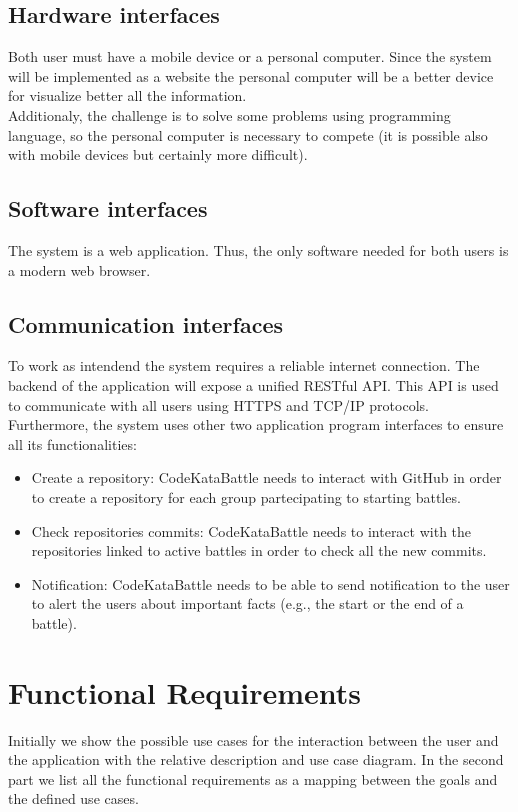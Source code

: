 \documentclass[12pt, a4paper]{report}
\begin{document}
        \subsection{Hardware interfaces}
        Both user must have a mobile device or a personal computer. 
        Since the system will be implemented as a website the personal computer will be a better device for visualize better all the information. \\
        Additionaly, the challenge is to solve some problems using programming language, so the personal computer is necessary to compete (it is possible also with mobile devices but certainly more difficult). 

        \subsection{Software interfaces}
        The system is a web application. 
        Thus, the only software needed for both users is a modern web browser. 

        \subsection{Communication interfaces}
        To work as intendend the system requires a reliable internet connection. 
        The backend of the application will expose a unified RESTful API. 
        This API is used to communicate with all users using HTTPS and TCP/IP protocols. \\
        Furthermore, the system uses other two application program interfaces to ensure all its functionalities: 
        \begin{itemize}
            \item Create a repository: CodeKataBattle needs to interact with GitHub in order to create a repository for each group partecipating to starting battles. 
            \item Check repositories commits: CodeKataBattle needs to interact with the repositories linked to active battles in order to check all the new commits. 
            \item Notification: CodeKataBattle needs to be able to send notification to the user to alert the users about important facts (e.g., the start or the end of a battle). 
        \end{itemize}

    \section{Functional Requirements}
        Initially we show the possible use cases for the interaction between the user and the application with the relative description and use case diagram. 
        In the second part we list all the functional requirements as a mapping between the goals and the defined use cases. 
\end{document}
